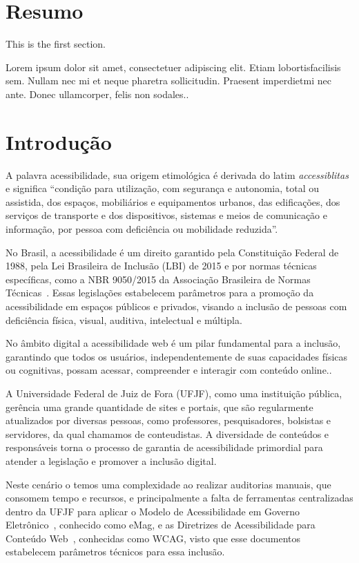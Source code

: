 \documentclass[article,12pt,oneside,a4paper,hyphens]{abntex2}
\begin{document}
\imprimircapa{}

\section{Resumo}
   
This is the first section.
      
Lorem  ipsum  dolor  sit  amet,  consectetuer  adipiscing  
elit.   Etiam  lobortisfacilisis sem.  Nullam nec mi et 
neque pharetra sollicitudin.  Praesent imperdietmi nec ante. 
Donec ullamcorper, felis non sodales..

\section{Introdução}

A palavra acessibilidade, sua origem etimológica é derivada do latim \textit{accessiblitas} 
e significa ``condição para utilização, com segurança e autonomia, 
total ou assistida, dos espaços, mobiliários e equipamentos urbanos, das 
edificações, dos serviços de transporte e dos dispositivos, sistemas e meios de
comunicação e informação, por pessoa com deficiência ou mobilidade reduzida''\cite{Acessibilidade}.

No Brasil, a acessibilidade é um direito garantido pela Constituição 
Federal de 1988, pela Lei Brasileira de Inclusão (LBI) de 2015 \Cite{LBI}
e por normas técnicas específicas, como a NBR 9050/2015 da Associação 
Brasileira de Normas Técnicas~\cite{ABNT}. Essas legislações estabelecem 
parâmetros para a promoção da acessibilidade em espaços públicos e privados,
visando a inclusão de pessoas com deficiência física, visual, auditiva, 
intelectual e múltipla.

No âmbito digital a acessibilidade web é um pilar fundamental para a 
inclusão, garantindo que todos os usuários, independentemente de suas
capacidades físicas ou cognitivas, possam acessar, compreender e interagir com
conteúdo online.\cite{wcag22}. 

A Universidade Federal de Juiz de Fora (UFJF), como uma instituição pública,
gerência uma grande quantidade de sites e portais, que são regularmente
atualizados por diversas pessoas, como professores, pesquisadores, bolsistas e
servidores, da qual chamamos de conteudistas. A diversidade de conteúdos e
responsáveis torna o processo de garantia de acessibilidade primordial para
atender a legislação e promover a inclusão digital.

Neste cenário o temos uma complexidade ao realizar auditorias manuais, que 
consomem tempo e recursos, e principalmente a falta de ferramentas 
centralizadas dentro da UFJF para aplicar o Modelo de Acessibilidade em 
Governo Eletrônico~\cite{emag}, conhecido como eMag, e as Diretrizes 
de Acessibilidade para Conteúdo Web~\cite{wcag22}, conhecidas como 
WCAG, visto que esse documentos estabelecem parâmetros técnicos para essa inclusão.
\end{document}
